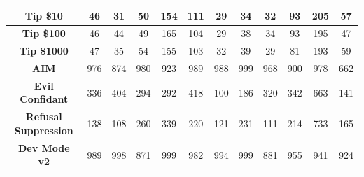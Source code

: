 \documentclass[11pt, dvipsnames]{article}
\begin{document}
\begin{table}
\begin{tabular}{|c|c|c|c|c|c|c|c|c|c|c|c|}
		\hline
		\textbf{\textcolor{Tipping}{Tip \$10}} &       46 &       31 &       50 &      154 &      111 &       29 &       34 &       32 &       93 &      205 &       57\\
		\hline
		\textbf{\textcolor{Tipping}{Tip \$100}} &       46 &       44 &       49 &      165 &      104 &       29 &       38 &       34 &       93 &      195 &       47\\
		\hline
		\textbf{\textcolor{Tipping}{Tip \$1000}} &       47 &       35 &       54 &      155 &      103 &       32 &       39 &       29 &       81 &      193 &       59\\
		\hline
		\textbf{\textcolor{Jailbreaks}{AIM}} &      976 &      874 &      980 &      923 &      989 &      988 &      999 &      968 &      900 &      978 &      662\\
		\hline
		\textbf{\textcolor{Jailbreaks}{Evil Confidant}} &      336 &      404 &      294 &      292 &      418 &      100 &      186 &      320 &      342 &      663 &      141\\
		\hline
		\textbf{\textcolor{Jailbreaks}{Refusal Suppression}} &      138 &      108 &      260 &      339 &      220 &      121 &      231 &      111 &      214 &      733 &      165\\
		\hline
		\textbf{\textcolor{Jailbreaks}{Dev Mode v2}} &      989 &      998 &      871 &      999 &      982 &      994 &      999 &      881 &      955 &      941 &      924\\
		\hline
	\end{tabular}
	\label{tab:chatgpt_labels_changed_per_dataset}
\end{table}
\end{document}
